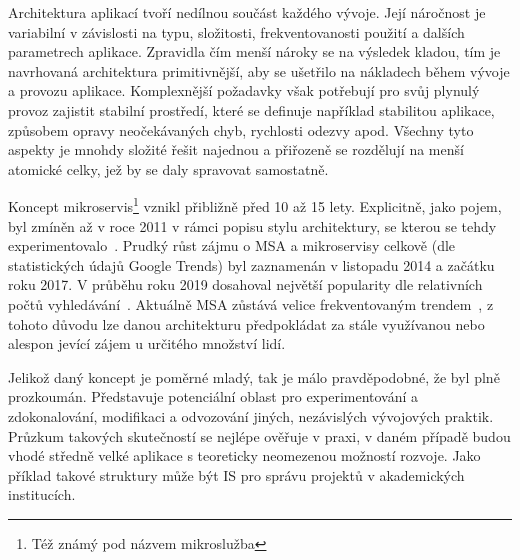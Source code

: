 Architektura aplikací tvoří nedílnou součást každého vývoje.
Její náročnost je variabilní v závislosti na typu, složitosti, frekventovanosti použití a dalších parametrech aplikace.
Zpravidla čím menší nároky se na výsledek kladou, tím je navrhovaná architektura primitivnější, aby se ušetřilo na nákladech během vývoje a provozu aplikace.
Komplexnější požadavky však potřebují pro svůj plynulý provoz zajistit stabilní prostředí, které se definuje například stabilitou aplikace, způsobem opravy neočekávaných chyb, rychlosti odezvy apod.
Všechny tyto aspekty je mnohdy složité řešit najednou a přiřozeně se rozdělují na menší atomické celky, jež by se daly spravovat samostatně.

Koncept mikroservis\footnote{Též známý pod názvem mikroslužba} vznikl přibližně před 10 až 15 lety.
Explicitně, jako pojem, byl zmíněn až v roce 2011 v rámci popisu stylu architektury, se kterou se tehdy experimentovalo~\cite{msabegin}.
Prudký růst zájmu o \gls{MSA} a mikroservisy celkově (dle statistických údajů Google Trends) byl zaznamenán v listopadu 2014 a začátku roku 2017.
V průběhu roku 2019 dosahoval největší popularity dle relativních počtů vyhledávání~\cite{googletrendsmsa}.
Aktuálně \gls{MSA} zůstává velice frekventovaným trendem~\cite{googletrendsmsa}, z tohoto důvodu lze danou architekturu předpokládat za stále využívanou nebo alespon jevící zájem u určitého množství lidí.

Jelikož daný koncept je poměrné mladý, tak je málo pravděpodobné, že byl plně prozkoumán.
Představuje potenciální oblast pro experimentování a zdokonalování, modifikaci a odvozování jiných, nezávislých vývojových praktik.
Průzkum takových skutečností se nejlépe ověřuje v praxi, v daném případě budou vhodé středně velké aplikace s teoreticky neomezenou možností rozvoje.
Jako příklad takové struktury může být \gls{IS} pro správu projektů v akademických institucích.

\clearpage



